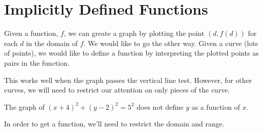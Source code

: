 \documentclass{ximera}
\begin{document}
\section{Implicitly Defined Functions}



Given a function, $f$, we can greate a graph by plotting the point $(d, f(d))$ for each $d$ in the domain of $f$. We would like to go the other way.  Given a curve (lots of points), we would like to define a function by interpreting the plotted points as pairs in the function.

This works well when the graph passes the vertical line test. However, for other curves, we will need to restrict our attention on only pieces of the curve.








The graph of $(x+4)^2 + (y-2)^2 = 5^2$ does not define $y$ as a function of $x$.


\begin{image}
\end{image}




In order to get a function, we'll need to restrict the domain and range.
\end{document}
